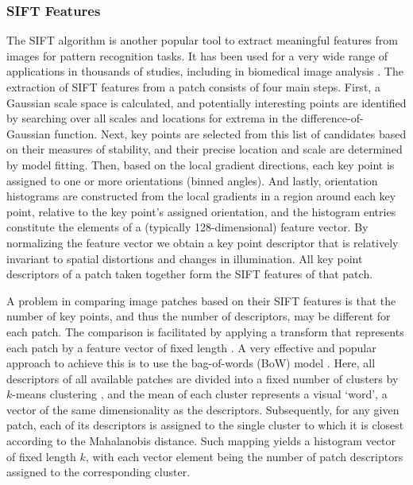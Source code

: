 \subsubsection{SIFT Features}
\label{subsubsec:sift-and-bow}

The SIFT algorithm \cite{lowe2004distinctive} is another popular tool to extract meaningful features from images for pattern recognition tasks. It has been used for a very wide range of applications in thousands of studies, including in biomedical image analysis \cite{ni2009reconstruction, jiang2010live, mualla2013automatic, zhang2013nonrigid, ni2009reconstruction, yu2016fast}. The extraction of SIFT features from a patch consists of four main steps. First, a Gaussian scale space is calculated, and potentially interesting points are identified by searching over all scales and locations for extrema in the difference-of-Gaussian function. Next, key points are selected from this list of candidates based on their measures of stability, and their precise location and scale are determined by model fitting. Then, based on the local gradient directions, each key point is assigned to one or more orientations (binned angles). And lastly, orientation histograms are constructed from the local gradients in a region around each key point, relative to the key point's assigned orientation, and the histogram entries constitute the elements of a (typically 128-dimensional) feature vector. By normalizing the feature vector we obtain a key point descriptor that is relatively invariant to spatial distortions and changes in illumination. All key point descriptors of a patch taken together form the SIFT features of that patch.

A problem in comparing image patches based on their SIFT features is that the number of key points, and thus the number of descriptors, may be different for each patch. The comparison is facilitated by applying a transform that represents each patch by a feature vector of fixed length \cite{yang2009linear}. A very effective and popular approach to achieve this is to use the bag-of-words (BoW) model \cite{fei2005bayesian}. Here, all descriptors of all available patches are divided into a fixed number of clusters by $k$-means clustering \cite{macqueen1967some}, and the mean of each cluster represents a visual `word', a vector of the same dimensionality as the descriptors. Subsequently, for any given patch, each of its descriptors is assigned to the single cluster to which it is closest according to the Mahalanobis distance. Such mapping yields a histogram vector of fixed length $k$, with each vector element being the number of patch descriptors assigned to the corresponding cluster.

